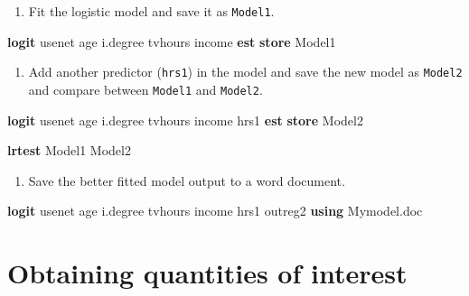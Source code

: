 \documentclass[
]{book}
\newenvironment{Shaded}{\begin{snugshade}}{\end{snugshade}}
\newcommand{\KeywordTok}[1]{\textcolor[rgb]{0.13,0.29,0.53}{\textbf{#1}}}
\newcommand{\NormalTok}[1]{#1}
\providecommand{\tightlist}{%
  \setlength{\itemsep}{0pt}\setlength{\parskip}{0pt}}
\begin{document}
\begin{alert}

\begin{enumerate}
\def\labelenumi{\arabic{enumi}.}
\tightlist
\item
  Fit the logistic model and save it as \texttt{Model1}.
\end{enumerate}

\begin{Shaded}
\begin{Highlighting}[]
\KeywordTok{logit}\NormalTok{ usenet age i.degree tvhours income }
\KeywordTok{est} \KeywordTok{store}\NormalTok{ Model1}
\end{Highlighting}
\end{Shaded}

\begin{enumerate}
\def\labelenumi{\arabic{enumi}.}
\setcounter{enumi}{1}
\tightlist
\item
  Add another predictor (\texttt{hrs1}) in the model and save the new model as \texttt{Model2} and compare between \texttt{Model1} and \texttt{Model2}.
\end{enumerate}

\begin{Shaded}
\begin{Highlighting}[]
\KeywordTok{logit}\NormalTok{ usenet age i.degree tvhours income hrs1}
\KeywordTok{est} \KeywordTok{store}\NormalTok{ Model2 }

\KeywordTok{lrtest}\NormalTok{ Model1 Model2}
\end{Highlighting}
\end{Shaded}

\begin{enumerate}
\def\labelenumi{\arabic{enumi}.}
\setcounter{enumi}{2}
\tightlist
\item
  Save the better fitted model output to a word document.
\end{enumerate}

\begin{Shaded}
\begin{Highlighting}[]
\KeywordTok{logit}\NormalTok{ usenet age i.degree tvhours income hrs1}
\NormalTok{outreg2 }\KeywordTok{using}\NormalTok{ Mymodel.doc}
\end{Highlighting}
\end{Shaded}

\end{alert}

\hypertarget{obtaining-quantities-of-interest}{%
\section{Obtaining quantities of interest}\label{obtaining-quantities-of-interest}}
\end{document}
